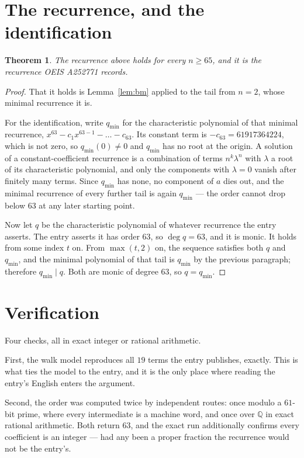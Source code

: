 \documentclass[11pt,a4paper]{article}
\theoremstyle{plain}
\newtheorem{theorem}{Theorem}
\theoremstyle{definition}
\begin{document}
\section{The recurrence, and the identification}

\begin{theorem}
The recurrence above holds for every $n\ge65$, and it is the recurrence OEIS A252771 records.
\end{theorem}

\begin{proof}
That it holds is Lemma~\ref{lem:bm} applied to the tail from $n=2$, whose minimal
recurrence it is.

For the identification, write $q_{\min}$ for the characteristic polynomial of that minimal
recurrence, $x^{63}-c_1x^{63-1}-\dots-c_{63}$. Its constant term is
$-c_{63}=61917364224$, which is not zero, so $q_{\min}(0)\neq0$ and $q_{\min}$ has no
root at the origin. A solution of a constant-coefficient recurrence is a combination of terms
$n^{k}\lambda^{n}$ with $\lambda$ a root of its characteristic polynomial, and only the
components with $\lambda=0$ vanish after finitely many terms. Since $q_{\min}$ has none, no
component of $a$ dies out, and the minimal recurrence of every further tail is again
$q_{\min}$ --- the order cannot drop below $63$ at any later starting point.

Now let $q$ be the characteristic polynomial of whatever recurrence the entry asserts. The
entry asserts it has order $63$, so $\deg q=63$, and it is monic. It holds from some
index $t$ on. From $\max(t,2)$ on, the sequence satisfies both $q$ and $q_{\min}$, and
the minimal polynomial of that tail is $q_{\min}$ by the previous paragraph; therefore
$q_{\min}\mid q$. Both are monic of degree $63$, so $q=q_{\min}$.
\end{proof}

\section{Verification}

Four checks, all in exact integer or rational arithmetic.

First, the walk model reproduces all $19$ terms the entry publishes, exactly. This is
what ties the model to the entry, and it is the only place where reading the entry's English
enters the argument.

Second, the order was computed twice by independent routes: once modulo a $61$-bit prime, where
every intermediate is a machine word, and once over $\mathbb{Q}$ in exact rational arithmetic.
Both return $63$, and the exact run additionally confirms every coefficient is an integer
--- had any been a proper fraction the recurrence would not be the entry's.
\end{document}
